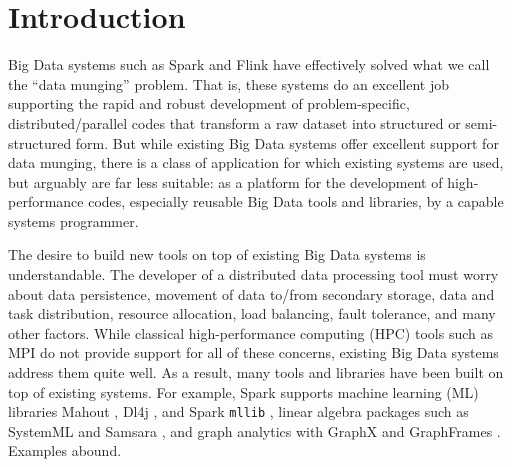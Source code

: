 
\section{Introduction}

Big Data systems such as Spark \cite{zaharia2010spark} and Flink \cite{alexandrov2014stratosphere, carbone2015apache}
have effectively solved what we call the ``data munging'' problem.  That is, 
these systems do an excellent job supporting the rapid
and robust development of problem-specific,
distributed/parallel codes that transform a raw dataset into structured 
or semi-structured form.
But while existing Big Data systems offer
excellent support for data munging,
there is a class of application for which 
existing systems are 
used, but arguably are far less suitable:
as a platform 
for the development of high-performance codes, especially reusable
Big Data tools and libraries, by a capable
systems programmer.

The desire to build new tools
on top of existing Big Data systems is understandable.  
The  developer of a distributed data processing tool must worry about data persistence, movement of
data to/from secondary storage, data
and task distribution, resource allocation, load balancing, fault tolerance, and many other factors.
While classical high-performance computing (HPC)
tools such as MPI \cite{gropp1996high} do not provide support for all of these concerns,
existing Big Data systems 
address them quite well.
As a result, many tools and libraries have been built on top of existing systems.  For example,
Spark supports
machine learning (ML) libraries Mahout \cite{mahout}, Dl4j \cite{dj4j}, 
and Spark \texttt{mllib} \cite{meng2016mllib}, linear algebra packages such as SystemML \cite{tian2012scalable, boehm2016systemml, ghoting2011systemml, boehm2014hybrid} and Samsara \cite{samsara}, and graph analytics with
GraphX \cite{gonzalez2014graphx} and GraphFrames
\cite{dave2016graphframes}.  Examples abound.

